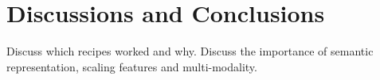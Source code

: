 \section{Discussions and Conclusions}
Discuss which recipes worked and why. Discuss the importance of semantic representation, scaling features and multi-modality.
